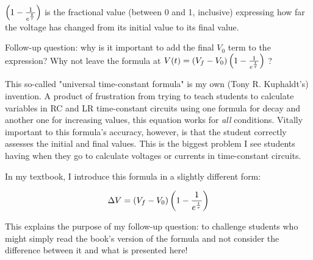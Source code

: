 $\left( 1 - {1 \over {e^{t \over \tau}}} \right)$ is the fractional value (between 0 and 1, inclusive) expressing how far the voltage has changed from its initial value to its final value.

\vskip 10pt

Follow-up question: why is it important to add the final $V_0$ term to the expression?  Why not leave the formula at $V(t) = \left( V_f - V_0 \right) \left( 1 - {1 \over {e^{t \over \tau}}} \right)$ ?






This so-called "universal time-constant formula" is my own (Tony R. Kuphaldt's) invention.  A product of frustration from trying to teach students to calculate variables in RC and LR time-constant circuits using one formula for decay and another one for increasing values, this equation works for {\it all} conditions.  Vitally important to this formula's accuracy, however, is that the student correctly assesses the initial and final values.  This is the biggest problem I see students having when they go to calculate voltages or currents in time-constant circuits.

In my  textbook, I introduce this formula in a slightly different form:

$$\Delta V = \left( V_f - V_0 \right) \left( 1 - {1 \over {e^{t \over \tau}}} \right)$$

This explains the purpose of my follow-up question: to challenge students who might simply read the book's version of the formula and not consider the difference between it and what is presented here!




